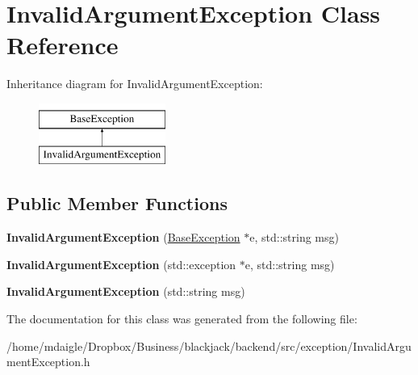 \hypertarget{classInvalidArgumentException}{
\section{\-Invalid\-Argument\-Exception \-Class \-Reference}
\label{db/d5c/classInvalidArgumentException}
}
\-Inheritance diagram for \-Invalid\-Argument\-Exception\-:\begin{figure}[H]
\begin{center}
\leavevmode
\includegraphics[height=2.000000cm]{db/d5c/classInvalidArgumentException}
\end{center}
\end{figure}
\subsection*{\-Public \-Member \-Functions}
\begin{DoxyCompactItemize}
\item 
\hypertarget{classInvalidArgumentException_a9ab42a5af9457a697a51c1c904cca999}{
{\bfseries \-Invalid\-Argument\-Exception} (\hyperlink{classBaseException}{\-Base\-Exception} $\ast$e, std\-::string msg)}
\label{db/d5c/classInvalidArgumentException_a9ab42a5af9457a697a51c1c904cca999}

\item 
\hypertarget{classInvalidArgumentException_af805c0537aaf08c08b1e3045d897f426}{
{\bfseries \-Invalid\-Argument\-Exception} (std\-::exception $\ast$e, std\-::string msg)}
\label{db/d5c/classInvalidArgumentException_af805c0537aaf08c08b1e3045d897f426}

\item 
\hypertarget{classInvalidArgumentException_a07518bc7558997376aeaa4d293a3eb5a}{
{\bfseries \-Invalid\-Argument\-Exception} (std\-::string msg)}
\label{db/d5c/classInvalidArgumentException_a07518bc7558997376aeaa4d293a3eb5a}

\end{DoxyCompactItemize}


\-The documentation for this class was generated from the following file\-:\begin{DoxyCompactItemize}
\item 
/home/mdaigle/\-Dropbox/\-Business/blackjack/backend/src/exception/\-Invalid\-Argument\-Exception.\-h\end{DoxyCompactItemize}
